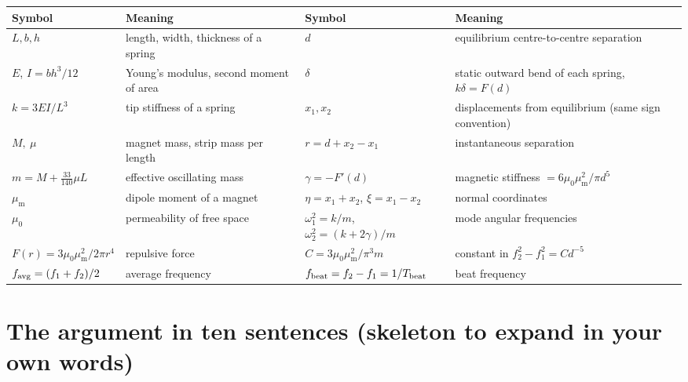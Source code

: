 \documentclass[11pt,a4paper]{article}
\newcommand{\muz}{\mu_0}
\newcommand{\mum}{\mu_{\mathrm m}}
\begin{document}
\begin{center}\footnotesize
\begin{tabular}{@{}p{3.1cm}p{4.1cm}p{3.6cm}p{4.9cm}@{}}
\toprule
Symbol & Meaning & Symbol & Meaning\\
\midrule
$L,b,h$ & length, width, thickness of a spring & $d$ & equilibrium centre-to-centre separation\\
$E$, $I=bh^3/12$ & Young's modulus, second moment of area & $\delta$ & static outward bend of each spring, $k\delta=F(d)$\\
$k=3EI/L^3$ & tip stiffness of a spring & $x_1,x_2$ & displacements from equilibrium (same sign convention)\\
$M,\ \mu$ & magnet mass, strip mass per length & $r=d+x_2-x_1$ & instantaneous separation\\
$m=M+\frac{33}{140}\mu L$ & effective oscillating mass & $\gamma=-F'(d)$ & magnetic stiffness $=6\muz\mum^2/\pi d^5$\\
$\mum$ & dipole moment of a magnet & $\eta=x_1+x_2$, $\xi=x_1-x_2$ & normal coordinates\\
$\muz$ & permeability of free space & $\omega_1^2=k/m$, $\omega_2^2=(k+2\gamma)/m$ & mode angular frequencies\\
$F(r)=3\muz\mum^2/2\pi r^4$ & repulsive force & $C=3\muz\mum^2/\pi^3m$ & constant in $f_2^2-f_1^2=Cd^{-5}$\\
$f_{\rm avg}=(f_1+f_2)/2$ & average frequency & $f_{\rm beat}=f_2-f_1=1/T_{\rm beat}$ & beat frequency\\
\bottomrule
\end{tabular}
\end{center}

\section{The argument in ten sentences (skeleton to expand in your own words)}
\end{document}
